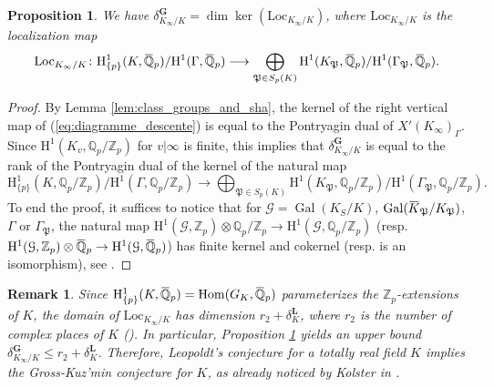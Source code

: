 \documentclass[12pt]{amsart}
\newcommand{\Q}{\mathbb{Q}}
\newcommand\Zp{{\mathbb{Z}_p}}
\newcommand\Qp{{\mathbb{Q}_p}}
\newcommand\cG{\mathcal{G}}
\newcommand\gP{\mathfrak{P}}
\newcommand{\ob}[1]{\mkern 1.5mu\overline{\mkern-1.5mu#1\mkern-1.5mu}\mkern 1.5mu}
\newcommand{\Loc}{\mathrm{Loc}}
\DeclareMathOperator{\Gal}{Gal}
\DeclareMathOperator{\Hom}{Hom}
\newcommand{\HH}{\mathrm{H}}
\theoremstyle{defstyle}
\newtheorem{remark}[subsubsection]{Remark}
\theoremstyle{thmstyle}
\newtheorem{proposition}[subsubsection]{Proposition}
\begin{document}
	\begin{proposition}\label{prop:premier_calcul_rang}
		We have $\delta^\textbf{G}_{K_\infty/K}=\dim \ker (\Loc_{K_\infty/K})$, where $\Loc_{K_\infty/K}$ is the localization map
		$$\Loc_{K_\infty/K} \colon \HH^1_{\{p\}}(K,\ob{\Q}_p)/\HH^1(\Gamma,\ob{\Q}_p) \longrightarrow \bigoplus_{\gP\in S_p(K)} \HH^1(K_\gP,\ob{\Q}_p)/\HH^1(\Gamma_\gP,\ob{\Q}_p).$$
	\end{proposition}
	\begin{proof}
		By Lemma \ref{lem:class_groups_and_sha}, the kernel of the right vertical map of (\ref{eq:diagramme_descente}) is equal to the Pontryagin dual of $X'(K_\infty)_\Gamma$. Since $\HH^1(K_v,\Qp/\Zp)$ for $v|\infty$ is finite, this implies that $\delta_{K_\infty/K}^\textbf{G}$ is equal to the rank of the Pontryagin dual of the kernel of the natural map 
		$$\HH^1_{\{p\}}(K,\Qp/\Zp)/\HH^1(\Gamma,\Qp/\Zp) \rightarrow \bigoplus_{\gP\in S_p(K)} \HH^1(K_\gP,\Qp/\Zp)/\HH^1(\Gamma_\gP,\Qp/\Zp).$$ 
		To end the proof, it suffices to notice that for $\cG=\Gal(K_{S}/K)$, $\Gal(\ob{K}_\gP/K_\gP)$,  $\Gamma$ or $\Gamma_\gP$, the natural map $\HH^1(\cG,\Zp) \otimes \Qp/\Zp \rightarrow\HH^1(\cG,\Qp/\Zp)$ (resp. $\HH^1(\cG,\Zp) \otimes \ob{\Q}_p\rightarrow \HH^1(\cG,\ob{\Q}_p)$) has finite kernel and cokernel (resp. is an isomorphism), see \cite[Appendix B \S~2]{rubinES}.
	\end{proof}
	
	\begin{remark}
		Since $\HH^1_{\{p\}}(K,\ob{\Q}_p)=\Hom(G_K,\ob{\Q}_p)$ parameterizes the $\Zp$-extensions of $K$, the domain of $\Loc_{K_\infty/K}$ has dimension $r_2 +\delta^\textbf{L}_K$, where $r_2$ is the number of complex places of $K$ (\cite[Theorem 13.4]{washington1997introduction}). In particular, Proposition \ref{prop:premier_calcul_rang} yields an upper bound $\delta^\textbf{G}_{K_\infty/K} \leq r_2 + \delta^\textbf{L}_K$. Therefore, Leopoldt's conjecture for a totally real field $K$ implies the Gross-Kuz'min conjecture for $K$, as already noticed by Kolster in \cite[Corollary 1.3]{kolster}.
	\end{remark}
	
\end{document}
